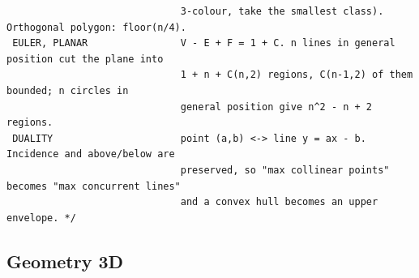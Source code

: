 \documentclass[9pt,a4paper,twocolumn]{extarticle}
\begin{document}
\begin{lstlisting}
                              3-colour, take the smallest class). Orthogonal polygon: floor(n/4).
 EULER, PLANAR                V - E + F = 1 + C. n lines in general position cut the plane into
                              1 + n + C(n,2) regions, C(n-1,2) of them bounded; n circles in
                              general position give n^2 - n + 2 regions.
 DUALITY                      point (a,b) <-> line y = ax - b. Incidence and above/below are
                              preserved, so "max collinear points" becomes "max concurrent lines"
                              and a convex hull becomes an upper envelope. */
\end{lstlisting}

\subsection{Geometry 3D}

\filbreak
\end{document}
